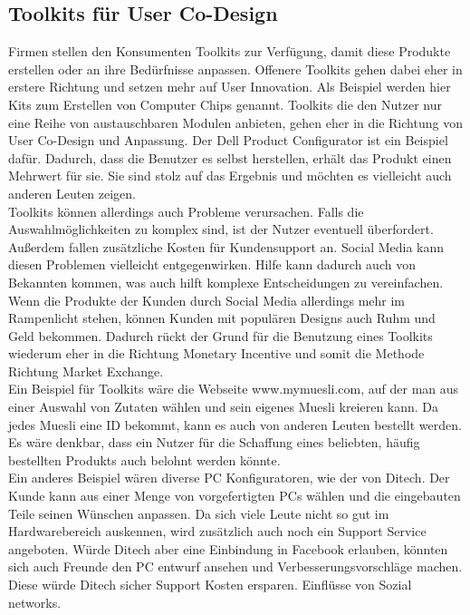 \subsection{Toolkits f\"ur User Co-Design}
Firmen stellen den Konsumenten Toolkits zur Verf\"ugung, damit diese Produkte erstellen oder an ihre Bed\"urfnisse anpassen. Offenere Toolkits gehen dabei eher in erstere Richtung und setzen mehr auf User Innovation. Als Beispiel werden hier Kits zum Erstellen von Computer Chips genannt. Toolkits die den Nutzer nur eine Reihe von austauschbaren Modulen anbieten, gehen eher in die Richtung von User Co-Design und Anpassung. Der Dell Product Configurator ist ein Beispiel daf\"ur. Dadurch, dass die Benutzer es selbst herstellen, erh\"alt das Produkt einen Mehrwert f\"ur sie. Sie sind stolz auf das Ergebnis und m\"ochten es vielleicht auch anderen Leuten zeigen.\\
Toolkits k\"onnen allerdings auch Probleme verursachen. Falls die Auswahlm\"oglichkeiten zu komplex sind, ist der Nutzer eventuell \"uberfordert. Au\ss{}erdem fallen zus\"atzliche Kosten f\"ur Kundensupport an. Social Media kann diesen Problemen vielleicht entgegenwirken. Hilfe kann dadurch auch von Bekannten kommen, was auch hilft komplexe Entscheidungen zu vereinfachen.
Wenn die Produkte der Kunden durch Social Media allerdings mehr im Rampenlicht stehen, k\"onnen Kunden mit popul\"aren Designs auch Ruhm und Geld bekommen. Dadurch r\"uckt der Grund f\"ur die Benutzung eines Toolkits wiederum eher in die Richtung Monetary Incentive und somit die Methode Richtung Market Exchange.\\
Ein Beispiel f\"ur Toolkits w\"are die Webseite www.mymuesli.com, auf der man aus einer Auswahl von Zutaten w\"ahlen und sein eigenes Muesli kreieren kann. Da jedes Muesli eine ID bekommt, kann es auch von anderen Leuten bestellt werden. Es w\"are denkbar, dass ein Nutzer f\"ur die Schaffung eines beliebten, h\"aufig bestellten Produkts auch belohnt werden k\"onnte.\\
Ein anderes Beispiel w\"aren diverse PC Konfiguratoren, wie der von Ditech\cite{DITECH}. Der Kunde kann aus einer Menge von vorgefertigten PCs w\"ahlen und die eingebauten Teile seinen W\"unschen anpassen. Da sich viele Leute nicht so gut im Hardwarebereich auskennen, wird zus\"atzlich auch noch ein Support Service angeboten. W\"urde Ditech aber eine Einbindung in Facebook erlauben, k\"onnten sich auch Freunde den PC entwurf ansehen und Verbesserungsvorschl\"age machen. Diese w\"urde Ditech sicher Support Kosten ersparen.
Einfl\"usse von Sozial networks.
